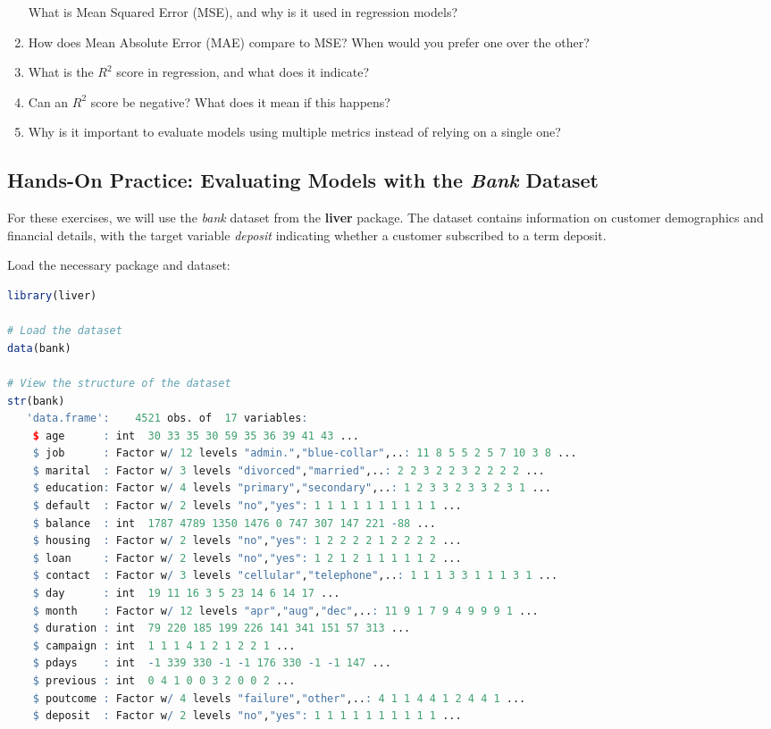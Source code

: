 \documentclass[
  11pt,
]{book}
\theoremstyle{definition}
\theoremstyle{definition}
\theoremstyle{definition}
\theoremstyle{definition}
\theoremstyle{remark}
\begin{document}
\begin{enumerate}
  What is Mean Squared Error (MSE), and why is it used in regression models?\\
\item
  How does Mean Absolute Error (MAE) compare to MSE? When would you prefer one over the other?\\
\item
  What is the \(R^2\) score in regression, and what does it indicate?\\
\item
  Can an \(R^2\) score be negative? What does it mean if this happens?\\
\item
  Why is it important to evaluate models using multiple metrics instead of relying on a single one?
\end{enumerate}

\subsection*{\texorpdfstring{Hands-On Practice: Evaluating Models with the \emph{Bank} Dataset}{Hands-On Practice: Evaluating Models with the Bank Dataset}}\label{hands-on-practice-evaluating-models-with-the-bank-dataset}


For these exercises, we will use the \emph{bank} dataset from the \textbf{liver} package. The dataset contains information on customer demographics and financial details, with the target variable \emph{deposit} indicating whether a customer subscribed to a term deposit.

Load the necessary package and dataset:

\begin{lstlisting}[language=R]
library(liver)

# Load the dataset
data(bank)

# View the structure of the dataset
str(bank)
   'data.frame':    4521 obs. of  17 variables:
    $ age      : int  30 33 35 30 59 35 36 39 41 43 ...
    $ job      : Factor w/ 12 levels "admin.","blue-collar",..: 11 8 5 5 2 5 7 10 3 8 ...
    $ marital  : Factor w/ 3 levels "divorced","married",..: 2 2 3 2 2 3 2 2 2 2 ...
    $ education: Factor w/ 4 levels "primary","secondary",..: 1 2 3 3 2 3 3 2 3 1 ...
    $ default  : Factor w/ 2 levels "no","yes": 1 1 1 1 1 1 1 1 1 1 ...
    $ balance  : int  1787 4789 1350 1476 0 747 307 147 221 -88 ...
    $ housing  : Factor w/ 2 levels "no","yes": 1 2 2 2 2 1 2 2 2 2 ...
    $ loan     : Factor w/ 2 levels "no","yes": 1 2 1 2 1 1 1 1 1 2 ...
    $ contact  : Factor w/ 3 levels "cellular","telephone",..: 1 1 1 3 3 1 1 1 3 1 ...
    $ day      : int  19 11 16 3 5 23 14 6 14 17 ...
    $ month    : Factor w/ 12 levels "apr","aug","dec",..: 11 9 1 7 9 4 9 9 9 1 ...
    $ duration : int  79 220 185 199 226 141 341 151 57 313 ...
    $ campaign : int  1 1 1 4 1 2 1 2 2 1 ...
    $ pdays    : int  -1 339 330 -1 -1 176 330 -1 -1 147 ...
    $ previous : int  0 4 1 0 0 3 2 0 0 2 ...
    $ poutcome : Factor w/ 4 levels "failure","other",..: 4 1 1 4 4 1 2 4 4 1 ...
    $ deposit  : Factor w/ 2 levels "no","yes": 1 1 1 1 1 1 1 1 1 1 ...
\end{lstlisting}
\end{document}
